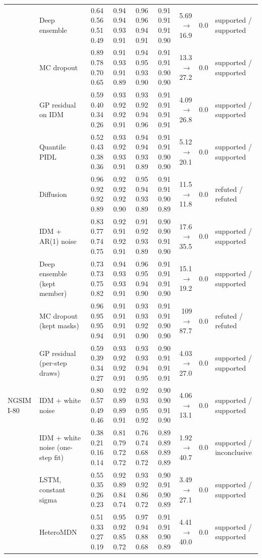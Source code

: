 \begin{longtable}{llrrrrrrl}
 & Deep ensemble & 0.64 0.56 0.51 0.49 & 0.94 0.94 0.93 0.91 & 0.96 0.96 0.94 0.91 & 0.91 0.91 0.91 0.90 & 5.69 $\rightarrow$ 16.9 & 0.0 & supported / supported \\
 & MC dropout & 0.89 0.78 0.70 0.65 & 0.91 0.93 0.91 0.89 & 0.94 0.95 0.93 0.90 & 0.91 0.91 0.90 0.90 & 13.3 $\rightarrow$ 27.2 & 0.0 & supported / supported \\
 & GP residual on IDM & 0.59 0.40 0.34 0.26 & 0.93 0.92 0.92 0.91 & 0.93 0.92 0.94 0.96 & 0.91 0.91 0.91 0.91 & 4.09 $\rightarrow$ 26.8 & 0.0 & supported / supported \\
 & Quantile PIDL & 0.52 0.43 0.38 0.36 & 0.93 0.92 0.93 0.91 & 0.94 0.94 0.93 0.89 & 0.91 0.91 0.90 0.90 & 5.12 $\rightarrow$ 20.1 & 0.0 & supported / supported \\
 & Diffusion & 0.96 0.92 0.92 0.89 & 0.92 0.92 0.92 0.90 & 0.95 0.94 0.93 0.89 & 0.91 0.91 0.90 0.89 & 11.5 $\rightarrow$ 11.8 & 0.0 & refuted / refuted \\
 & IDM + AR(1) noise & 0.83 0.77 0.74 0.75 & 0.92 0.91 0.92 0.91 & 0.91 0.92 0.93 0.89 & 0.90 0.90 0.91 0.90 & 17.6 $\rightarrow$ 35.5 & 0.0 & supported / supported \\
 & Deep ensemble (kept member) & 0.73 0.73 0.75 0.82 & 0.94 0.93 0.93 0.91 & 0.96 0.95 0.94 0.90 & 0.91 0.91 0.91 0.90 & 15.1 $\rightarrow$ 19.2 & 0.0 & supported / supported \\
 & MC dropout (kept masks) & 0.96 0.95 0.95 0.94 & 0.91 0.91 0.91 0.91 & 0.93 0.93 0.92 0.90 & 0.91 0.91 0.90 0.90 & 109 $\rightarrow$ 87.7 & 0.0 & refuted / refuted \\
 & GP residual (per-step draws) & 0.59 0.39 0.34 0.27 & 0.93 0.92 0.92 0.91 & 0.93 0.93 0.94 0.95 & 0.90 0.91 0.91 0.91 & 4.03 $\rightarrow$ 27.0 & 0.0 & supported / supported \\
\midrule
NGSIM I-80 & IDM + white noise & 0.80 0.57 0.49 0.46 & 0.92 0.89 0.89 0.91 & 0.92 0.93 0.95 0.92 & 0.90 0.90 0.91 0.90 & 4.06 $\rightarrow$ 13.1 & 0.0 & supported / supported \\
 & IDM + white noise (one-step fit) & 0.38 0.21 0.16 0.14 & 0.81 0.79 0.72 0.72 & 0.76 0.74 0.68 0.72 & 0.89 0.89 0.89 0.89 & 1.92 $\rightarrow$ 40.7 & 0.0 & supported / inconclusive \\
 & LSTM, constant sigma & 0.55 0.35 0.26 0.23 & 0.92 0.89 0.84 0.74 & 0.93 0.92 0.86 0.72 & 0.90 0.91 0.90 0.89 & 3.49 $\rightarrow$ 27.1 & 0.0 & supported / supported \\
 & HeteroMDN & 0.51 0.33 0.27 0.19 & 0.95 0.92 0.85 0.72 & 0.97 0.94 0.88 0.68 & 0.91 0.91 0.90 0.89 & 4.41 $\rightarrow$ 40.0 & 0.0 & supported / supported \\

\end{longtable}
